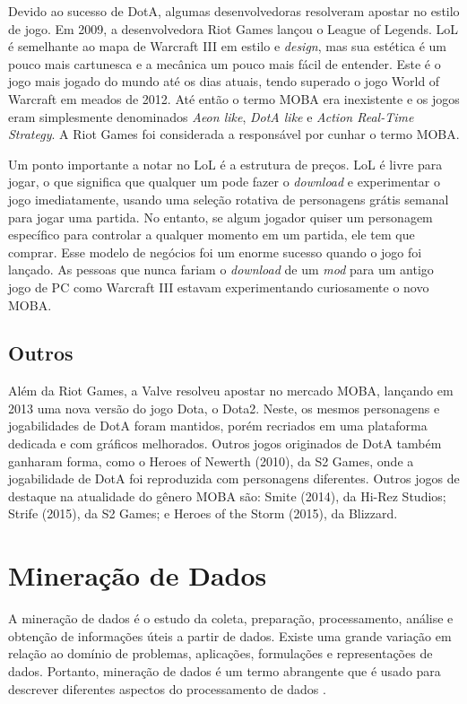 Devido ao sucesso de DotA, algumas desenvolvedoras resolveram apostar no estilo de jogo. Em 2009, a desenvolvedora Riot Games lançou o League of Legends. LoL é semelhante ao mapa de Warcraft III em estilo e \textit{design}, mas sua estética é um pouco mais cartunesca e a mecânica um pouco mais fácil de entender. Este é o jogo mais jogado do mundo até os dias atuais, tendo superado o jogo World of Warcraft em meados de 2012. Até então o termo MOBA era inexistente e os jogos eram simplesmente denominados \textit{Aeon like}, \textit{DotA like} e \textit{Action Real-Time Strategy}. A Riot Games foi considerada a responsável por cunhar o termo MOBA.

Um ponto importante a notar no LoL é a estrutura de preços. LoL é livre para jogar, o que significa que qualquer um pode fazer o \textit{download} e experimentar o jogo imediatamente, usando uma seleção rotativa de personagens grátis semanal para jogar uma partida. No entanto, se algum jogador quiser um personagem específico para controlar a qualquer momento em um partida, ele tem que comprar. Esse modelo de negócios foi um enorme sucesso quando o jogo foi lançado. As pessoas que nunca fariam o \textit{download} de um \textit{mod} para um antigo jogo de PC como Warcraft III estavam experimentando curiosamente o novo MOBA.

\subsection{Outros}
Além da Riot Games, a Valve resolveu apostar no mercado MOBA, lançando em 2013 uma nova versão do jogo Dota, o Dota2. Neste, os mesmos personagens e jogabilidades de DotA foram mantidos, porém recriados em uma plataforma dedicada e com gráficos melhorados. Outros jogos originados de DotA também ganharam forma, como o Heroes of Newerth (2010), da S2 Games, onde a jogabilidade de DotA foi reproduzida com personagens diferentes. Outros jogos de destaque na atualidade do gênero MOBA são: Smite (2014), da Hi-Rez Studios; Strife (2015), da S2 Games; e Heroes of the Storm (2015), da Blizzard.

\section{Mineração de Dados}
A mineração de dados é o estudo da coleta, preparação, processamento, análise e obtenção de informações úteis a partir de dados. Existe uma grande variação em relação ao domínio de problemas, aplicações, formulações e representações de dados. Portanto, mineração de dados é um termo abrangente que é usado para descrever diferentes aspectos do processamento de dados \cite{aggarwal2015data}.

